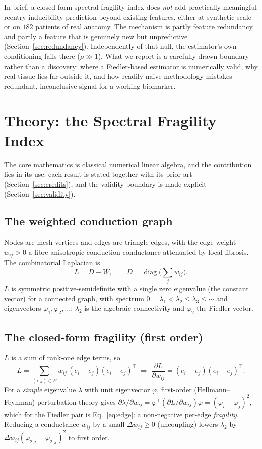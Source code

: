 \documentclass[11pt]{article}
\theoremstyle{definition}
\newcommand{\lam}{\lambda}
\newcommand{\phii}{\varphi}
\newcommand{\rhoval}{\rho}
\begin{document}
In brief, a closed-form spectral
fragility index does \emph{not} add practically meaningful reentry-inducibility
prediction beyond existing features, either at synthetic scale or on $182$
patients of real anatomy. The mechanism is partly feature redundancy and partly a
feature that is genuinely new but unpredictive (Section~\ref{sec:redundancy}).
Independently of that null, the estimator's own conditioning fails there
($\rhoval\gg 1$). What we report is a carefully drawn boundary rather than a
discovery: where a Fiedler-based estimator is numerically valid, why real tissue
lies far outside it, and how readily naive methodology mistakes redundant,
inconclusive signal for a working biomarker.

\section{Theory: the Spectral Fragility Index}
\label{sec:theory}
The core mathematics is classical numerical linear algebra, and the contribution
lies in its use: each result is stated together with its prior art
(Section~\ref{sec:credits}), and the validity boundary is made explicit
(Section~\ref{sec:validity}).

\subsection{The weighted conduction graph}
Nodes are mesh vertices and edges are triangle edges, with the edge weight
$w_{ij}>0$ a fibre-anisotropic conduction conductance attenuated by local
fibrosis. The combinatorial Laplacian is
\begin{equation}
L=D-W,\qquad D=\operatorname{diag}\Big(\textstyle\sum_j w_{ij}\Big).
\end{equation}
$L$ is symmetric positive-semidefinite with a single zero eigenvalue (the
constant vector) for a connected graph, with spectrum
$0=\lam_1<\lam_2\leq\lam_3\leq\cdots$ and eigenvectors $\phii_1,\phii_2,\dots$;
$\lam_2$ is the algebraic connectivity and $\phii_2$ the Fiedler vector.

\subsection{The closed-form fragility (first order)}
$L$ is a sum of rank-one edge terms, so
\begin{equation}
L=\sum_{(i,j)\in E} w_{ij}\,(e_i-e_j)(e_i-e_j)^{\!\top}
\;\Longrightarrow\;
\frac{\partial L}{\partial w_{ij}}=(e_i-e_j)(e_i-e_j)^{\!\top}.
\label{eq:dL}
\end{equation}
For a \emph{simple} eigenvalue $\lam$ with unit eigenvector $\phii$,
first-order (Hellmann--Feynman) perturbation theory gives
$\partial\lam/\partial w_{ij}=\phii^{\!\top}(\partial L/\partial w_{ij})\phii
=(\phii_i-\phii_j)^2$, which for the Fiedler pair is Eq.~\eqref{eq:edge}: a
non-negative per-edge \emph{fragility}. Reducing a conductance $w_{ij}$ by a
small $\Delta w_{ij}\geq 0$ (uncoupling) lowers $\lam_2$ by
$\Delta w_{ij}(\phii_{2,i}-\phii_{2,j})^2$ to first order.
\end{document}
